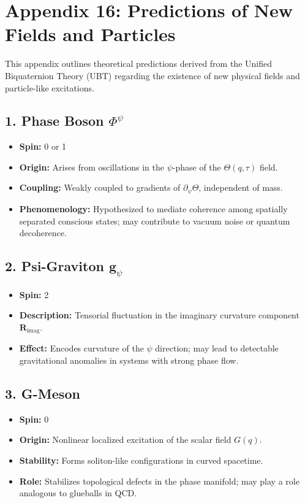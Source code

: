 
\appendix
\section*{Appendix 16: Predictions of New Fields and Particles}

This appendix outlines theoretical predictions derived from the Unified Biquaternion Theory (UBT) regarding the existence of new physical fields and particle-like excitations.

\subsection*{1. Phase Boson \(\Phi^\psi\)}

\begin{itemize}
  \item \textbf{Spin:} 0 or 1
  \item \textbf{Origin:} Arises from oscillations in the \(\psi\)-phase of the \(\Theta(q,\tau)\) field.
  \item \textbf{Coupling:} Weakly coupled to gradients of \(\partial_\psi \Theta\), independent of mass.
  \item \textbf{Phenomenology:} Hypothesized to mediate coherence among spatially separated conscious states; may contribute to vacuum noise or quantum decoherence.
\end{itemize}

\subsection*{2. Psi-Graviton \(\mathbf{g}_{\psi}\)}

\begin{itemize}
  \item \textbf{Spin:} 2
  \item \textbf{Description:} Tensorial fluctuation in the imaginary curvature component \(\mathbf{R}_{\text{imag}}\).
  \item \textbf{Effect:} Encodes curvature of the \(\psi\) direction; may lead to detectable gravitational anomalies in systems with strong phase flow.
\end{itemize}

\subsection*{3. G-Meson}

\begin{itemize}
  \item \textbf{Spin:} 0
  \item \textbf{Origin:} Nonlinear localized excitation of the scalar field \(G(q)\).
  \item \textbf{Stability:} Forms soliton-like configurations in curved spacetime.
  \item \textbf{Role:} Stabilizes topological defects in the phase manifold; may play a role analogous to glueballs in QCD.
\end{itemize}

